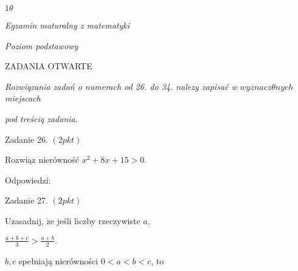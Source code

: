 \documentclass[a4paper,12pt]{article}
\begin{document}
$ 1\theta$

{\it Egzamin maturalny z matematyki}

{\it Poziom podstawowy}

ZADANIA OTWARTE

{\it Rozwiqzania zadań o numerach od 26. do 34. nalezy zapisać w} $wyznacz\theta nych$ {\it miejscach}

{\it pod treściq zadania}.

Zadanie 26. $(2pkt)$

Rozwiąz nierówność $x^{2}+8x+15>0.$

Odpowiedzí:

Zadanie 27. $(2pkt)$

Uzasadnij, $\dot{\mathrm{z}}\mathrm{e}$ jeśli liczby rzeczywiste $a,$

$\displaystyle \frac{a+b+c}{3}>\frac{a+b}{2}.$

$b, c$ spełniają nierówności $0<a<b<c$, to
\end{document}
